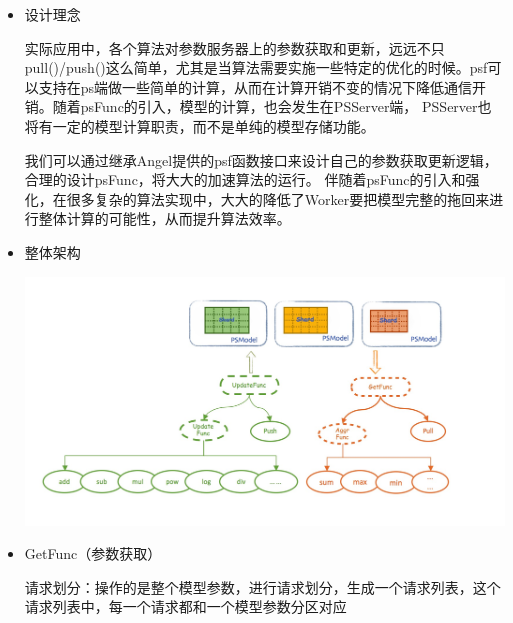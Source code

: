 \documentclass{article}
\begin{document}
\begin{itemize}%

\item{}
设计理念%

\hspace*{1em}\hspace*{1em}实际应用中，各个算法对参数服务器上的参数获取和更新，远远不只pull()/push()这么简单，尤其是当算法需要实施一些特定的优化的时候。psf可以支持在ps端做一些简单的计算，从而在计算开销不变的情况下降低通信开销。随着psFunc的引入，模型的计算，也会发生在PSServer端，
PSServer也将有一定的模型计算职责，而不是单纯的模型存储功能。%

\hspace*{1em}\hspace*{1em}我们可以通过继承Angel提供的psf函数接口来设计自己的参数获取更新逻辑，合理的设计psFunc，将大大的加速算法的运行。
伴随着psFunc的引入和强化，在很多复杂的算法实现中，大大的降低了Worker要把模型完整的拖回来进行整体计算的可能性，从而提升算法效率。%

\item{}
整体架构%

\includegraphics[keepaspectratio=true,width=\dimmin{}{\dimwidth{0.90}}]{images/angel_psFunc}{}%

\item{}
GetFunc（参数获取）%

请求划分：操作的是整个模型参数，进行请求划分，生成一个请求列表，这个请求列表中，每一个请求都和一个模型参数分区对应%


\end{itemize}
\end{document}
